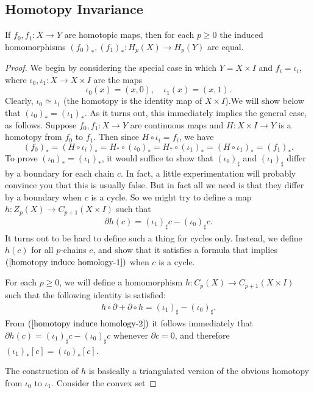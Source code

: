 \subsection{Homotopy Invariance}
\begin{theorem}\label{homology homotopy equivalence}
If $f_0,f_1:X\to Y$ are homotopic maps, then for each $p\geq0$ the induced homomorphisms $(f_0)_*,(f_1)_*:H_p(X)\to H_p(Y)$ are equal.
\end{theorem}
\begin{proof}
We begin by considering the special case in which $Y=X\times I$ and $f_i=\iota_i$, where $\iota_0,\iota_1:X\to X\times I$ are the maps
\[\iota_0(x)=(x,0),\quad\iota_1(x)=(x,1).\]
Clearly, $\iota_0\simeq\iota_1$ (the homotopy is the identity map of $X\times I$).We will show below that $(\iota_0)_*=(\iota_1)_*$. As it turns out, this immediately implies the general case, as follows. Suppose $f_0,f_1:X\to Y$ are continuous maps and $H:X\times I\to Y$ is a homotopy from $f_0$ to $f_1$. Then since $H\circ\iota_i=f_i$, we have
\[(f_0)_*=(H\circ\iota_i)_*=H_*\circ(\iota_0)_*=H_*\circ(\iota_1)_*=(H\circ\iota_1)_*=(f_1)_*.\]
To prove $(\iota_0)_*=(\iota_1)_*$, it would suffice to show that $(\iota_0)_{\sharp}$ and $(\iota_1)_{\sharp}$ differ by a boundary for each chain $c$. In fact, a little experimentation will probably convince
you that this is usually false. But in fact all we need is that they differ by a boundary when $c$ is a cycle. So we might try to define a map $h:Z_p(X)\to C_{p+1}(X\times I)$ such that
\begin{align}\label{homotopy induce homology-1}
\partial h(c)=(\iota_1)_{\sharp}c-(\iota_0)_{\sharp}c.
\end{align}
It turns out to be hard to define such a thing for cycles only. Instead, we define $h(c)$ for all $p$-chains $c$, and show that it satisfies a formula that implies $(\ref{homotopy induce homology-1})$ when $c$ is a cycle.\par
For each $p\geq0$, we will define a homomorphism $h:C_p(X)\to C_{p+1}(X\times I)$ such that the following identity is satisfied:
\begin{align}\label{homotopy induce homology-2}
h\circ\partial+\partial\circ h=(\iota_1)_{\sharp}-(\iota_0)_{\sharp}.
\end{align}
From $(\ref{homotopy induce homology-2})$ it follows immediately that $\partial h(c)=(\iota_1)_{\sharp}c-(\iota_0)_{\sharp}c$ whenever $\partial c=0$, and therefore $(\iota_1)_*[c]=(\iota_0)_*[c]$.\par
The construction of $h$ is basically a triangulated version of the obvious homotopy from $\iota_0$ to $\iota_1$. Consider the convex set 

\end{proof}
